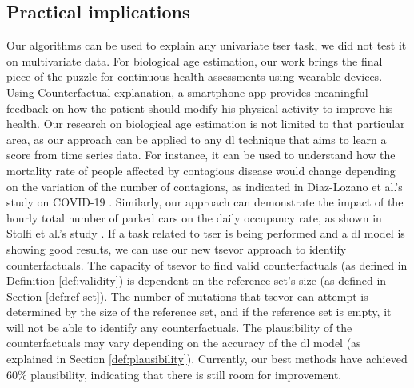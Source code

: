 \subsection{Practical implications}
Our algorithms can be used to explain any univariate \gls{tser} task, we did not test it on multivariate data. For biological age estimation, our work brings the final piece of the puzzle for continuous health assessments using wearable devices. Using Counterfactual explanation, a smartphone app provides meaningful feedback on how the patient should modify his physical activity to improve his health. Our research on biological age estimation is not limited to that particular area, as our approach can be applied to any \gls{dl} technique that aims to learn a score from time series data. For instance, it can be used to understand how the mortality rate of people affected by contagious disease would change depending on the variation of the number of contagions, as indicated in Diaz-Lozano et al.'s study on COVID-19 \cite{diaz-lozano_covid-19_2022}. Similarly, our approach can demonstrate the impact of the hourly total number of parked cars on the daily occupancy rate, as shown in Stolfi et al.'s study \cite{stolfi_predicting_2017}. If a task related to \gls{tser} is being performed and a \gls{dl} model is showing good results, we can use our new \gls{tsevor} approach to identify counterfactuals. The capacity of \gls{tsevor} to find valid counterfactuals (as defined in Definition \ref{def:validity}) is dependent on the reference set's size (as defined in Section \ref{def:ref-set}). The number of mutations that \gls{tsevor} can attempt is determined by the size of the reference set, and if the reference set is empty, it will not be able to identify any counterfactuals. The plausibility of the counterfactuals may vary depending on the accuracy of the \gls{dl} model (as explained in Section \ref{def:plausibility}). Currently, our best methods have achieved 60\% plausibility, indicating that there is still room for improvement.

